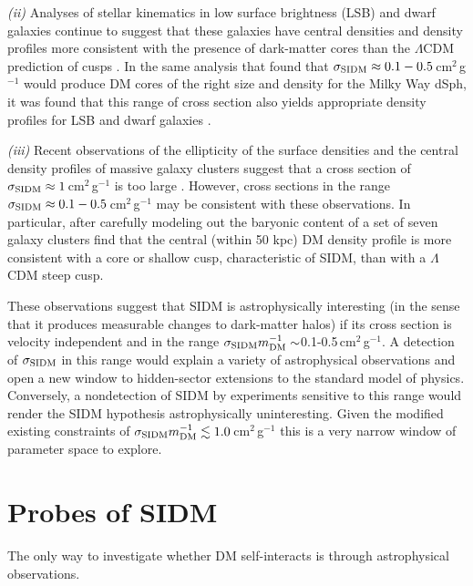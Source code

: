 {\it (ii)} Analyses of stellar kinematics in low surface
brightness (LSB) and dwarf galaxies continue to suggest that these
galaxies have central densities and density profiles more consistent
with the presence of dark-matter cores than the $\Lambda$CDM
prediction of cusps \citep{Simon:2005fu, deNaray:2008iz, Oh:2011jd}.  In the same
analysis that found that $\sigma_{\rm SIDM} \approx 0.1-0.5$\,cm$^2$\,g$^{-1}$ would produce DM cores of the right size and
density for the Milky Way dSph, it was found that this range of cross
section also yields appropriate density profiles for LSB and dwarf
galaxies \citep{Rocha:2012tr}.

{\it (iii)} Recent observations of the ellipticity of the surface
densities \citep{Richard:2010bo} and the central density
profiles \citep{Newman:2012wt, Newman:2012tk} of massive galaxy clusters
suggest that a cross section of $\sigma_{\rm SIDM} \approx 1$\,cm$^2$\,g$^{-1}$ is too large \citep{Peter:2012vi, Rocha:2012tr}.
However, cross sections in the range $\sigma_{\rm SIDM} \approx 0.1-0.5$\,cm$^2$\,g$^{-1}$ may be consistent with these observations.  In
particular, after carefully modeling out the baryonic content of a set
of seven galaxy clusters \citet{Newman:2012tk} find that the central
(within 50 kpc) DM density profile is more consistent with a core or
shallow cusp, characteristic of SIDM, than with a $\Lambda$CDM steep
cusp.

These observations suggest that SIDM is astrophysically interesting
(in the sense that it produces measurable changes to dark-matter
halos) if its cross section is velocity independent and in the range $\sigma_{\rm SIDM}m_{\rm DM}^{-1}\sim$0.1-0.5\,cm$^2$\,g$^{-1}$.  A detection of
$\sigma_{\rm SIDM}$ in this range would explain a variety of astrophysical
observations and open a new window to hidden-sector extensions to the
standard model of physics.  Conversely, a nondetection of SIDM by
experiments sensitive to this range would render the SIDM hypothesis
astrophysically uninteresting.
Given the modified existing constraints of $\sigma_{\rm SIDM}m_{\rm DM}^{-1}\lesssim 1.0$\,cm$^2$\,g$^{-1}$ this is a very narrow window of parameter space to explore.

\section{Probes of SIDM}

The only way to investigate whether DM self-interacts is through astrophysical observations.

